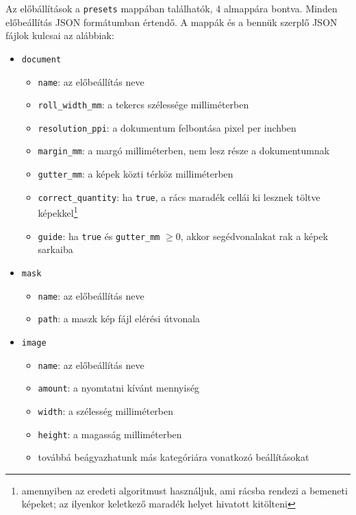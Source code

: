 Az előbállítások a \texttt{presets} mappában találhatók, 4 almappára bontva. Minden előbeállítás JSON formátumban értendő. A mappák és a bennük szerplő JSON fájlok kulcsai az alábbiak:
\begin{itemize}
    \item \texttt{document}
    \begin{itemize}
        \item \texttt{name}: az előbeállítás neve
        \item \texttt{roll\_width\_mm}: a tekercs szélessége milliméterben
        \item \texttt{resolution\_ppi}: a dokumentum felbontása pixel per inchben
        \item \texttt{margin\_mm}: a margó milliméterben, nem lesz része a dokumentumnak
        \item \texttt{gutter\_mm}: a képek közti térköz milliméterben
        \item \texttt{correct\_quantity}: ha \texttt{true}, a rács maradék cellái ki lesznek töltve képekkel\footnote{amennyiben az eredeti algoritmust használjuk, ami rácsba rendezi a bemeneti képeket; az ilyenkor keletkező maradék helyet hivatott kitölteni}
        \item \texttt{guide}: ha \texttt{true} és \texttt{gutter\_mm} \begin{math}
            \geq 0
        \end{math}, akkor segédvonalakat rak a képek sarkaiba
    \end{itemize}

    \item \texttt{mask}
    \begin{itemize}
        \item \texttt{name}: az előbeállítás neve
        \item \texttt{path}: a maszk kép fájl elérési útvonala
    \end{itemize}

    \item \texttt{image}
    \begin{itemize}
        \item \texttt{name}: az előbeállítás neve
        \item \texttt{amount}: a nyomtatni kívánt mennyiség
        \item \texttt{width}: a szélesség milliméterben
        \item \texttt{height}: a magasság milliméterben
        \item továbbá beágyazhatunk más kategóriára vonatkozó beállításokat
    \end{itemize}
\end{itemize}